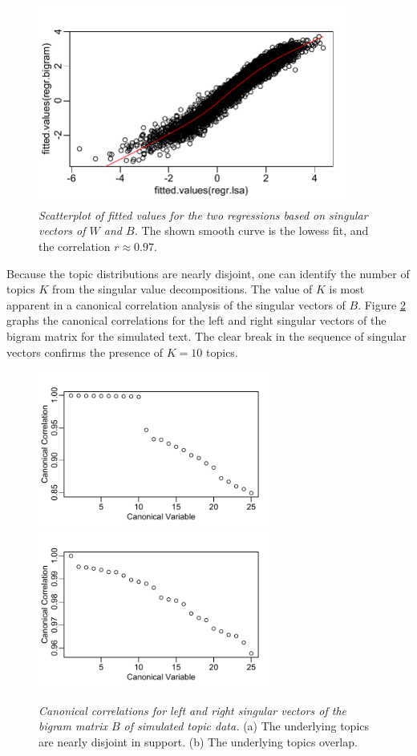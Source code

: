 \documentclass[12pt]{article}
\begin{document}
\begin{figure}
\caption{ \label{fig:simfits}  
{\sl Scatterplot of fitted values for the two regressions based on singular vectors of $W$ and $B$.}  The shown smooth curve is the lowess fit, and the correlation $r \approx 0.97$.}
\centerline{  \includegraphics[width=4in]{figures/simfits}  }
\end{figure}


Because the topic distributions are nearly disjoint, one can identify the number of topics $K$ from the singular value decompositions.  The value of $K$ is most apparent in a canonical correlation analysis of the singular vectors of $B$.  Figure \ref{fig:simccab} graphs the canonical correlations for the left and right singular vectors
of the bigram matrix for the simulated text.  The clear break in the sequence of singular vectors confirms the presence of $K=10$ topics.  

 \begin{figure}
  \caption{ \label{fig:simccab} { \sl Canonical correlations for left and right
 singular vectors of the bigram matrix $B$ of simulated topic data.} (a) The underlying topics are nearly disjoint in support. (b) The underlying topics overlap.}
\vspace{0.1in}
 \centerline{
      \includegraphics[width=3in]{figures/simccab}  
      \includegraphics[width=3in]{figures/simccabb}   }
  \end{figure}
 
\end{document}
